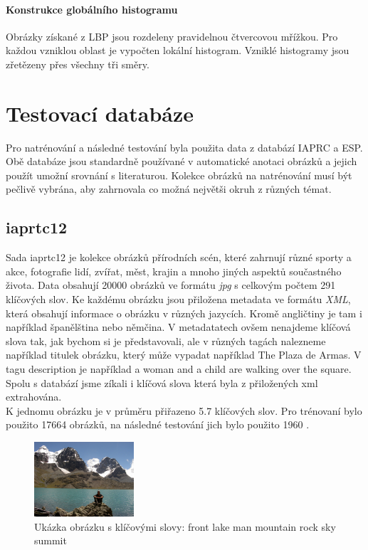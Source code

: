 \documentclass[czech,BP]{thesiskiv}
\begin{document}
\subsubsection{Konstrukce globálního histogramu}
\par Obrázky získané z LBP jsou rozdeleny pravidelnou čtvercovou mřížkou. Pro každou vzniklou oblast je vypočten lokální histogram. Vzniklé histogramy jsou zřetězeny přes všechny tři směry.

\chapter{Testovací databáze}
\par Pro natrénování a následné testování byla použita data z databází IAPRC a ESP. Obě databáze jsou standardně používané v automatické anotaci obrázků a jejich použít umožní srovnání s literaturou. Kolekce obrázků na natrénování musí být pečlivě vybrána, aby zahrnovala co možná největši okruh z různých témat. 

\section{iaprtc12}
\par Sada iaprtc12 je kolekce obrázků přírodních scén, které zahrnují různé sporty a akce, fotografie lidí, zvířat, měst, krajin a mnoho jiných aspektů součastného života. Data obsahují \num{20 000} obrázků ve formátu \textit{jpg} s celkovým počtem \num{291} klíčových slov. Ke každému obrázku jsou přiložena metadata ve formátu \textit{XML}, která obsahují informace o obrázku v různých jazycích. Kromě angličtiny je tam i například španělština nebo němčina. V metadatatech ovšem nenajdeme klíčová slova tak, jak bychom si je představovali, ale v různých tagách nalezneme například titulek obrázku, který může vypadat například The Plaza de Armas. V tagu description je například  a woman and a child are walking over the square. Spolu s databází jsme zíkali i klíčová slova která byla z přiložených xml extrahována.\\
K jednomu obrázku je v průměru přiřazeno \num{5.7} klíčových slov. Pro trénovaní bylo použito \num{17 664} obrázků, na následné testování jich bylo použito \num{1960} \cite{ESPvon2004labeling}. 


\begin{figure}[h]
		\centering
		\includegraphics[width=140px]{./img/iaprtc12.jpg}	
		\caption{Ukázka obrázku s klíčovými slovy: front lake man mountain rock sky summit}
\end{figure}
\end{document}
